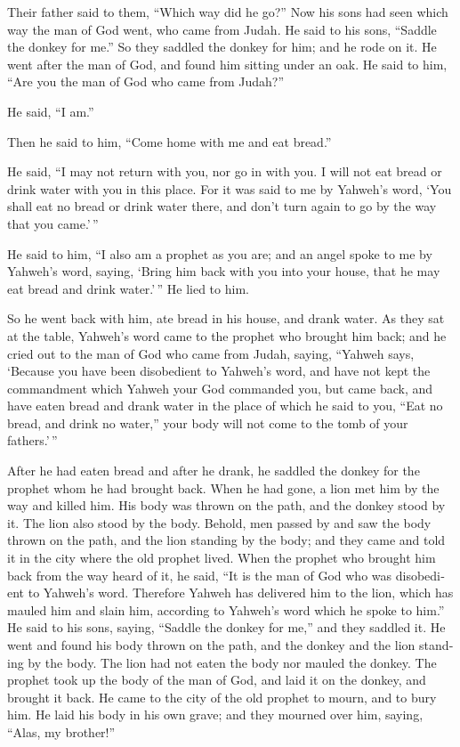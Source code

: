 \begin{paracol}{2}
\begin{otherlanguage}{english}
 Their father said to them, ``Which way did he go?'' Now
his sons had seen which way the man of God went, who came from Judah.
 He said to his sons, ``Saddle the donkey for me.'' So
they saddled the donkey for him; and he rode on it.  He
went after the man of God, and found him sitting under an oak. He said
to him, ``Are you the man of God who came from Judah?''

He said, ``I am.''

 Then he said to him, ``Come home with me and eat
bread.''

 He said, ``I may not return with you, nor go in with
you. I will not eat bread or drink water with you in this place.
 For it was said to me by Yahweh's word, `You shall eat
no bread or drink water there, and don't turn again to go by the way
that you came.'\,''

 He said to him, ``I also am a prophet as you are; and an
angel spoke to me by Yahweh's word, saying, `Bring him back with you
into your house, that he may eat bread and drink water.'\,'' He lied to
him.

 So he went back with him, ate bread in his house, and
drank water.  As they sat at the table, Yahweh's word
came to the prophet who brought him back;  and he cried
out to the man of God who came from Judah, saying, ``Yahweh says,
`Because you have been disobedient to Yahweh's word, and have not kept
the commandment which Yahweh your God commanded you,  but
came back, and have eaten bread and drank water in the place of which he
said to you, ``Eat no bread, and drink no water,'' your body will not
come to the tomb of your fathers.'\,''

 After he had eaten bread and after he drank, he saddled
the donkey for the prophet whom he had brought back. 
When he had gone, a lion met him by the way and killed him. His body was
thrown on the path, and the donkey stood by it. The lion also stood by
the body.  Behold, men passed by and saw the body thrown
on the path, and the lion standing by the body; and they came and told
it in the city where the old prophet lived.  When the
prophet who brought him back from the way heard of it, he said, ``It is
the man of God who was disobedient to Yahweh's word. Therefore Yahweh
has delivered him to the lion, which has mauled him and slain him,
according to Yahweh's word which he spoke to him.''  He
said to his sons, saying, ``Saddle the donkey for me,'' and they saddled
it.  He went and found his body thrown on the path, and
the donkey and the lion standing by the body. The lion had not eaten the
body nor mauled the donkey.  The prophet took up the body
of the man of God, and laid it on the donkey, and brought it back. He
came to the city of the old prophet to mourn, and to bury him.
 He laid his body in his own grave; and they mourned over
him, saying, ``Alas, my brother!''


\end{otherlanguage}
\end{paracol}
